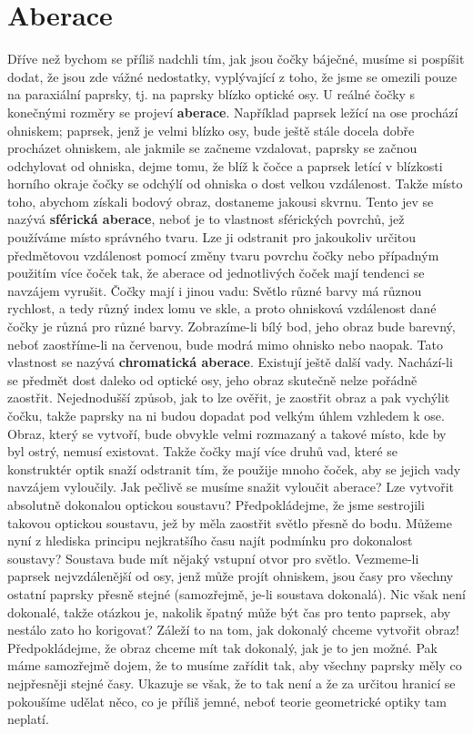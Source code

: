 {  \section{Aberace}\label{fyz:IchapXXVIIsecVI}
    Dříve než bychom se příliš nadchli tím, jak jsou čočky báječné, musíme si pospíšit dodat, že 
    jsou zde vážné nedostatky, vyplývající z toho, že jsme se omezili pouze na paraxiální paprsky, 
    tj. na paprsky blízko optické osy. U reálné čočky s konečnými rozměry se projeví 
    \textbf{aberace}. Například paprsek ležící na ose prochází ohniskem; paprsek, jenž je velmi 
    blízko osy, bude ještě stále docela dobře procházet ohniskem, ale jakmile se začneme vzdalovat, 
    paprsky se začnou odchylovat od ohniska, dejme tomu, že blíž k čočce a paprsek letící v 
    blízkosti horního okraje čočky se odchýlí od ohniska o dost velkou vzdálenost. Takže místo 
    toho, abychom získali bodový obraz, dostaneme jakousi skvrnu. Tento jev se nazývá 
    \textbf{sférická aberace}, neboť je to vlastnost sférických povrchů, jež používáme místo 
    správného tvaru. Lze ji odstranit pro jakoukoliv určitou předmětovou vzdálenost pomocí změny 
    tvaru povrchu čočky nebo případným použitím více čoček tak, že aberace od jednotlivých čoček 
    mají tendenci se navzájem vyrušit. Čočky mají i jinou vadu: Světlo různé barvy má různou 
    rychlost, a tedy různý index lomu ve skle, a proto ohnisková vzdálenost dané čočky je různá pro 
    různé barvy. Zobrazíme-li bílý bod, jeho obraz bude barevný, neboť zaostříme-li na červenou, 
    bude modrá mimo ohnisko nebo naopak. Tato vlastnost se nazývá \textbf{chromatická aberace}. 
    Existují ještě další vady. Nachází-li se předmět dost daleko od optické osy, jeho obraz 
    skutečně nelze pořádně zaostřit. Nejednodušší způsob, jak to lze ověřit, je zaostřit obraz a 
    pak vychýlit čočku, takže paprsky na ni budou dopadat pod velkým úhlem vzhledem k ose. Obraz, 
    který se vytvoří, bude obvykle velmi rozmazaný a takové místo, kde by byl ostrý, nemusí 
    existovat. Takže čočky mají více druhů vad, které se konstruktér optik snaží odstranit tím, že 
    použije mnoho čoček, aby se jejich vady navzájem vyloučily. Jak pečlivě se musíme snažit 
    vyloučit aberace? Lze vytvořit absolutně dokonalou optickou soustavu? Předpokládejme, že jsme 
    sestrojili takovou optickou soustavu, jež by měla zaostřit světlo přesně do bodu. Můžeme nyní z 
    hlediska principu nejkratšího času najít podmínku pro dokonalost soustavy? Soustava bude mít 
    nějaký vstupní otvor pro světlo. Vezmeme-li paprsek nejvzdálenější od osy, jenž může projít 
    ohniskem, jsou časy pro všechny ostatní paprsky přesně stejné (samozřejmě, je-li soustava 
    dokonalá). Nic však není dokonalé, takže otázkou je, nakolik špatný může být čas pro tento 
    paprsek, aby nestálo zato ho korigovat? Záleží to na tom, jak dokonalý chceme vytvořit obraz! 
    Předpokládejme, že obraz chceme mít tak dokonalý, jak je to jen možné. Pak máme samozřejmě 
    dojem, že to musíme zařídit tak, aby všechny paprsky měly co nejpřesněji stejné časy. Ukazuje 
    se však, že to tak není a že za určitou hranicí se pokoušíme udělat něco, co je příliš jemné, 
    neboť teorie geometrické optiky tam neplatí. 
    
}
